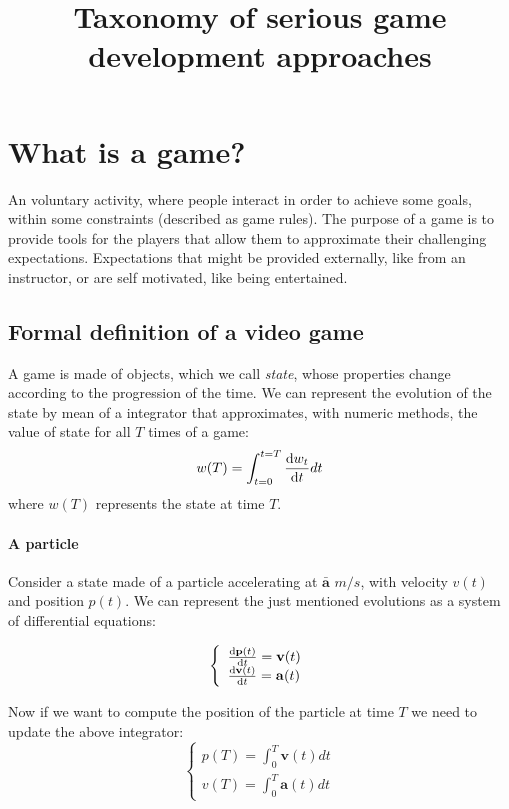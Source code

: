 \documentclass[10pt,a4paper]{article}
\begin{document}
\title{Taxonomy of serious game development approaches}
\date{}
\maketitle

\section{What is a game?}
An voluntary activity, where people interact in order to achieve some goals, within some constraints (described as game rules).
The purpose of a game is to provide tools for the players that allow them to approximate their challenging expectations. Expectations that might be provided externally, like from an instructor, or are self motivated, like being entertained.


\subsection{Formal definition of a video game}
A game is made of objects, which we call \textit{state}, whose properties change according to the progression of the time. We can represent the evolution of the state by mean of a integrator that approximates, with numeric methods, the value of state for all $T$ times of a game:
\begin{equation}\label{eq:1}
w(T) = \int_{t = 0}^{t=T} \dv{w_t}{t} dt
\end{equation}
\noindent
where $w(T)$ represents the state at time $T$. 


\paragraph{A particle} Consider a state made of a particle accelerating at  $\bar{\mathbf{a}}$ $m/s$, with velocity $v(t)$ and position $p(t)$. We can represent the just mentioned evolutions as a system of differential equations:

\begin{equation}\label{eq:2}
\left \lbrace
\begin{array}{l}
\dv{\mathbf{p}(t)}{t} = \mathbf{v}(t)\\
\dv{\mathbf{v}(t)}{t} = \mathbf{a}(t)
\end{array}
\right.
\end{equation}


\noindent
Now if we want to compute the position of the particle at time $T$ we need to update the above integrator:
\begin{equation}\label{eq:3}
\left \lbrace
\begin{array}{l}
p(T) = \int_{0}^{T} \mathbf{v}(t) dt \\
v(T) = \int_{0}^{T} \mathbf{a}(t) dt
\end{array}
\right.
\end{equation}
\end{document}
